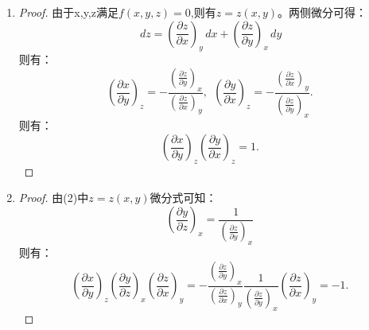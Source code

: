 \documentclass[reqno,a4paper,12pt]{amsart}
\begin{document}
\begin{enumerate}
\begin{proof}
\begin{equation*}
		\begin{aligned}
			\left( \frac{\partial y}{\partial z} \right)_w =& \frac{\left( \frac{\partial f}{\partial z} \right)_{x, y} \left( \frac{\partial w}{\partial x} \right)_y}{\left( \frac{\partial w}{\partial y} \right)_x \left( \frac{\partial f}{\partial x} \right)_{y, z} - \left( \frac{\partial w}{\partial x} \right)_y \left( \frac{\partial f}{\partial y} \right)_{z, x}} \\
			\left( \frac{\partial x}{\partial z} \right)_w =& \frac{\left( \frac{\partial f}{\partial z} \right)_{x, y} \left( \frac{\partial w}{\partial y} \right)_x}{\left( \frac{\partial w}{\partial x} \right)_y \left( \frac{\partial f}{\partial y} \right)_{z, x} - \left( \frac{\partial w}{\partial y} \right)_x \left( \frac{\partial f}{\partial x} \right)_{y, z}}
		\end{aligned}
		\end{equation*}
		\[
			\left( \frac{\partial x}{\partial y} \right)_w \left( \frac{\partial y}{\partial z} \right)_w = \frac{\left( \frac{\partial f}{\partial z} \right)_{x, y} \left( \frac{\partial w}{\partial y} \right)_x}{\left( \frac{\partial w}{\partial x} \right)_y \left( \frac{\partial f}{\partial y} \right)_{z, x} - \left( \frac{\partial w}{\partial y} \right)_x \left( \frac{\partial f}{\partial x} \right)_{y, z}} = \left( \frac{\partial x}{\partial z} \right)_w.
		\]
	\end{proof}
	
	\item
	\begin{proof}
		由于x,y,z满足$f(x, y ,z) = 0$,则有$z = z(x, y)$。两侧微分可得：
		\[
			\,dz = \left( \frac{\partial z}{\partial x} \right)_y \,dx + \left( \frac{\partial z}{\partial y} \right)_x \,dy
		\]
		则有：
		\[
			\left( \frac{\partial x}{\partial y} \right)_z = - \frac{\left( \frac{\partial z}{\partial y} \right)_x}{\left( \frac{\partial z}{\partial x} \right)_y},~~ \left( \frac{\partial y}{\partial x} \right)_z = -\frac{\left( \frac{\partial z}{\partial x} \right)_y}{\left( \frac{\partial z}{\partial y} \right)_x}.
		\]
		则有：
		\[
			\left( \frac{\partial x}{\partial y} \right)_z \left( \frac{\partial y}{\partial x} \right)_z = 1.
		\]
	\end{proof}
	
	\item
	\begin{proof}
		由(2)中$z = z(x, y)$微分式可知：
		\[
			\left( \frac{\partial y}{\partial z} \right)_x = \frac{1}{\left( \frac{\partial z}{\partial y} \right)_x}
		\]
		则有：
		\[
			\left( \frac{\partial x}{\partial y} \right)_z \left( \frac{\partial y}{\partial z} \right)_x \left( \frac{\partial z}{\partial x} \right)_y = -\frac{\left( \frac{\partial z}{\partial y} \right)_x}{\left( \frac{\partial z}{\partial x} \right)_y}\frac{1}{\left( \frac{\partial z}{\partial y} \right)_x} \left( \frac{\partial z}{\partial x} \right)_y = -1.
		\]
	\end{proof}
	

\end{enumerate}
\end{document}
